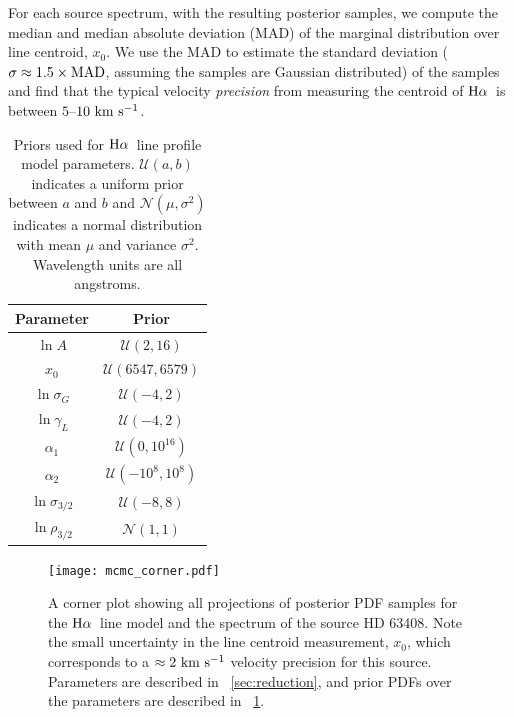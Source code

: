 \documentclass[modern, letterpaper]{aastex61}
\newcommand{\Ha}{\ensuremath{{\rm H}\alpha}}
\begin{document}
For each source spectrum, with the resulting posterior samples, we compute the
median and median absolute deviation (MAD) of the marginal distribution over
line centroid, $x_0$.
We use the MAD to estimate the standard deviation ($\sigma \approx 1.5\times{\rm
MAD}$, assuming the samples are Gaussian distributed) of the samples and find
that the typical velocity \emph{precision} from measuring the centroid of \Ha\
is between $5$--$10~\mathrm{km}~\mathrm{s}^{-1}$.

\begin{table}[ht]
  \begin{center}
    \begin{tabular}{ c | c }
      \toprule
        Parameter & Prior \\\toprule
        $\ln A$ & $\mathcal{U}(2, 16)$\\
        $x_0$ & $\mathcal{U}(6547, 6579)$\\
        $\ln\sigma_G$ & $\mathcal{U}(-4, 2)$\\
        $\ln\gamma_L$ & $\mathcal{U}(-4, 2)$\\
        $\alpha_1$ & $\mathcal{U}(0, 10^{16})$\\
        $\alpha_2$ & $\mathcal{U}(-10^8, 10^8)$\\
        $\ln\sigma_{3/2}$ & $\mathcal{U}(-8, 8)$\\
        $\ln\rho_{3/2}$ & $\mathcal{N}(1, 1)$\\
      \bottomrule
    \end{tabular}
    \caption{
      Priors used for \Ha\ line profile model parameters.
      $\mathcal{U}(a, b)$ indicates a uniform prior between $a$ and $b$ and
      $\mathcal{N}(\mu, \sigma^2)$ indicates a normal distribution with mean
      $\mu$ and variance $\sigma^2$.
      Wavelength units are all angstroms.
      \label{tbl:prior-bounds}
    }
  \end{center}
\end{table}

\begin{figure}[htbp]
  \begin{center}
    \texttt{[image: mcmc\_corner.pdf]}
  \end{center}
  \caption{%
    A corner plot showing all projections of posterior PDF samples for the \Ha\
    line model and the spectrum of the source HD 63408.
    Note the small uncertainty in the line centroid measurement, $x_0$, which
    corresponds to a $\approx 2~\mathrm{km}~\mathrm{s}^{-1}$ velocity precision for this source.
    Parameters are described in \sectionname~\ref{sec:reduction}, and prior PDFs
    over the parameters are described in \tablename~\ref{tbl:prior-bounds}.
    \label{fig:Halpha-mcmc-corner}}
\end{figure}
\end{document}
